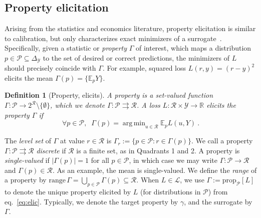 \documentclass[11pt]{article} %
\newcommand{\Comments}{1}
\newcommand{\mytodo}[2]{\ifnum\Comments=1%
	\todo[linecolor=#1!80!black,backgroundcolor=#1,bordercolor=#1!80!black]{#2}\fi}
\newcommand{\raft}[1]{\mytodo{green!20!white}{RF: #1}}
\newcommand{\jessiet}[1]{\mytodo{teal!20!white}{JF: #1}}
\newcommand{\reals}{\mathbb{R}}
\newcommand{\simplex}{\Delta_\Y}
\newcommand{\prop}[2][\mathcal{P}]{\mathrm{prop}_{#1}[#2]}
\newcommand{\range}{\mathrm{range}\,}
\newcommand{\E}{\mathbb{E}}
\renewcommand{\L}{\mathcal{L}}
\newcommand{\R}{\mathcal{R}}
\renewcommand{\P}{\mathcal{P}}
\newcommand{\Y}{\mathcal{Y}}
\newcommand{\exploss}[3]{\E_{#3} #1(#2,Y)}
\newcommand{\toto}{\rightrightarrows}
\newtheorem{definition}{Definition}
\DeclareMathOperator*{\argmin}{arg\,min}
\begin{document}
\subsection{Property elicitation}\label{subsec:properties}
Arising from the statistics and economics literature, property elicitation is similar to calibration, but only characterizes exact minimizers of a surrogate~\citep{savage1971elicitation,osband1985information-eliciting,lambert2008eliciting,lambert2009eliciting,lambert2018elicitation,frongillo2015vector-valued,frongillo2014general}.
Specifically, given a statistic or \emph{property} $\Gamma$ of interest, which maps a distribution $p \in \P \subseteq \simplex$ to the set of desired or correct predictions, the minimizers of $L$ should precisely coincide with $\Gamma$.
For example, squared loss $L(r,y) = (r-y)^2$ elicits the mean $\Gamma(p) = \{\E_p Y\}$.

\begin{definition}[Property, elicits]
	A \emph{property} is a set-valued function $\Gamma : \P \to 2^\R \setminus \{\emptyset\}$, which we denote $\Gamma: \P \toto \R$.
	A loss $L : \R \times \Y \to \reals$ \emph{elicits} the property $\Gamma$ if
	\begin{equation}
    \label{eq:elic}    
    \forall p \in \P, \;\; \Gamma(p) = \argmin_{u \in \R} \exploss{L}{u}{p}~.
	\end{equation}
\end{definition}
The \emph{level set} of $\Gamma$ at value $r\in\R$ is $\Gamma_r := \{p \in \P : r \in \Gamma(p)\}$.
We call a property $\Gamma: \P \toto \R$ \emph{discrete} if $\R$ is a finite set, as in Quadrants 1 and 2.
A property is \emph{single-valued} if $|\Gamma(p)|=1$ for all $p\in\P$, in which case we may write $\Gamma:\P\to\R$ and $\Gamma(p) \in \R$.
As an example, the mean is single-valued.
We define the \emph{range} of a property by $\range \Gamma = \bigcup_{p\in\P} \Gamma(p) \subseteq \R$.
When $L\in\L$, we use $\Gamma := \prop[\P]{L}$ to denote the unique property elicited by $L$ (for distributions in $\P$) from eq.~\eqref{eq:elic}. 
Typically, we denote the target property by $\gamma$, and the surrogate by $\Gamma$.
\end{document}
